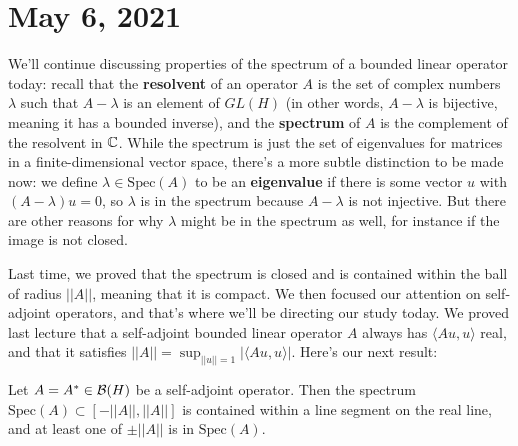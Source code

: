 \pagebreak\section*{May 6, 2021}

We'll continue discussing properties of the spectrum of a bounded linear operator today: recall that the \textbf{resolvent} of an operator $A$ is the set of complex numbers $\lambda$ such that $A - \lambda$ is an element of $GL(H)$ (in other words, $A - \lambda$ is bijective, meaning it has a bounded inverse), and the \textbf{spectrum} of $A$ is the complement of the resolvent in $\mathbb C$. While the spectrum is just the set of eigenvalues for matrices in a finite-dimensional vector space, there's a more subtle distinction to be made now: we define $\lambda \in \text{Spec}(A)$ to be an \textbf{eigenvalue} if there is some vector $u$ with $(A - \lambda)u = 0$, so $\lambda$ is in the spectrum because $A - \lambda$ is not injective. But there are other reasons for why $\lambda$ might be in the spectrum as well, for instance if the image is not closed. 

Last time, we proved that the spectrum is closed and is contained within the ball of radius $||A||$, meaning that it is compact. We then focused our attention on self-adjoint operators, and that's where we'll be directing our study today. We proved last lecture that a self-adjoint bounded linear operator $A$ always has $\langle Au, u \rangle$ real, and that it satisfies $||A|| = \sup_{||u|| = 1} |\langle Au, u \rangle|$. Here's our next result:

\begin{theorem}\label{spectrumisinrealline}
Let $A = A^\ast \in \mathcal{B}(H)$ be a self-adjoint operator. Then the spectrum $\text{Spec}(A) \subset [-||A||, ||A||]$ is contained within a line segment on the real line, and at least one of $\pm ||A||$ is in $\text{Spec}(A)$.
\end{theorem}

